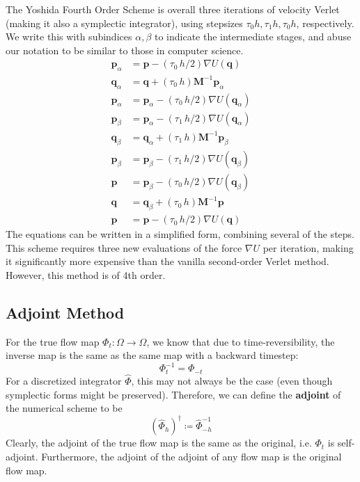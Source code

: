       The Yoshida Fourth Order Scheme is overall three iterations of velocity Verlet (making it also a symplectic integrator), using stepsizes $\tau_0 h, \tau_1 h, \tau_0 h$, respectively. We write this with subindices $\alpha, \beta$ to indicate the intermediate stages, and abuse our notation to be similar to those in computer science. 
      \begin{align*}
        \mathbf{p}_\alpha & = \mathbf{p} - (\tau_0\, h/2) \nabla U(\mathbf{q}) \\
        \mathbf{q}_\alpha & = \mathbf{q} + (\tau_0 \, h) \mathbf{M}^{-1} \mathbf{p}_\alpha \\
        \mathbf{p}_\alpha & = \mathbf{p}_\alpha - (\tau_0 \, h / 2) \nabla U(\mathbf{q}_\alpha) \\
        \mathbf{p}_\beta & = \mathbf{p}_\alpha - (\tau_1 \, h/2) \nabla U(\mathbf{q}_\alpha) \\
        \mathbf{q}_\beta & = \mathbf{q}_\alpha + (\tau_1 \, h) \mathbf{M}^{-1} \mathbf{p}_\beta \\
        \mathbf{p}_\beta & = \mathbf{p}_\beta - (\tau_1 \, h/2) \nabla U(\mathbf{q}_\beta) \\
        \mathbf{p} & = \mathbf{p}_\beta - (\tau_0 \, h/2) \nabla U(\mathbf{q}_\beta) \\
        \mathbf{q} & = \mathbf{q}_\beta + (\tau_0 \, h) \mathbf{M}^{-1} \mathbf{p} \\
        \mathbf{p} & = \mathbf{p} - (\tau_0 \, h/2) \nabla U(\mathbf{q}) 
      \end{align*}
      The equations can be written in a simplified form, combining several of the steps. This scheme requires three new evaluations of the force $\nabla U$ per iteration, making it significantly more expensive than the vanilla second-order Verlet method. However, this method is of 4th order. 

  \subsection{Adjoint Method}

    For the true flow map $\Phi_t: \Omega \longrightarrow \Omega$, we know that due to time-reversibility, the inverse map is the same as the same map with a backward timestep: 
    \begin{equation}
      \Phi_t^{-1} = \Phi_{-t}
    \end{equation}
    For a discretized integrator $\hat{\Phi}$, this may not always be the case (even though symplectic forms might be preserved). Therefore, we can define the \textbf{adjoint} of the numerical scheme to be 
    \begin{equation}
      (\hat{\Phi}_{h})^\dagger \coloneqq \hat{\Phi}_{-h}^{-1}
    \end{equation}
    Clearly, the adjoint of the true flow map is the same as the original, i.e. $\Phi_t$ is self-adjoint. Furthermore, the adjoint of the adjoint of any flow map is the original flow map. 

